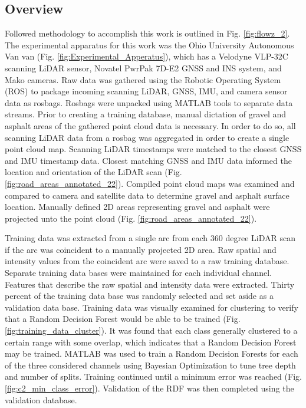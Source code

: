 \documentclass[numbered,pdftex]{ohio-etd}
\begin{document}
{
	
	\subsection{Overview}
	
		{Followed methodology to accomplish this work is outlined in Fig. \ref{fig:flowz_2}. The experimental apparatus for this work was the Ohio University Autonomous Van van (Fig. \ref{fig:Experimental_Apperatus}), which has a Velodyne VLP-32C scanning LiDAR sensor, Novatel PwrPak 7D-E2 GNSS and INS system, and Mako cameras. Raw data was gathered using the Robotic Operating System (ROS) to package incoming scanning LiDAR, GNSS, IMU, and camera sensor data as rosbags. Rosbags were unpacked using MATLAB tools to separate data streams. Prior to creating a training database, manual dictation of gravel and asphalt areas of the gathered point cloud data is necessary. In order to do so, all scanning LiDAR data from a rosbag was aggregated in order to create a single point cloud map. Scanning LiDAR timestamps were matched to the closest GNSS and IMU timestamp data. Closest matching GNSS and IMU data informed the location and orientation of the LiDAR scan (Fig. \ref{fig:road_areas_annotated_22}). Compiled point cloud maps was examined and compared to camera and satellite data to determine gravel and asphalt surface location. Manually defined 2D areas representing gravel and asphalt were projected unto the point cloud (Fig. \ref{fig:road_areas_annotated_22}).}
		
		{Training data was extracted from a single arc from each 360 degree LiDAR scan if the arc was coincident to a manually projected 2D area. Raw spatial and intensity values from the coincident arc were saved to a raw training database. Separate training data bases were maintained for each individual channel. Features that describe the raw spatial and intensity data were extracted. Thirty percent of the training data base was randomly selected and set aside as a validation data base. Training data was visually examined for clustering to verify that a Random Decision Forest would be able to be trained (Fig. \ref{fig:training_data_cluster}). It was found that each class generally clustered to a certain range with some overlap, which indicates that a Random Decision Forest may be trained. MATLAB was used to train a Random Decision Forests for each of the three considered channels using Bayesian Optimization to tune tree depth and number of splits. Training continued until a minimum error was reached (Fig. \ref{fig:c2_min_class_error}). Validation of the RDF was then completed using the validation database.}
		
}
\end{document}
